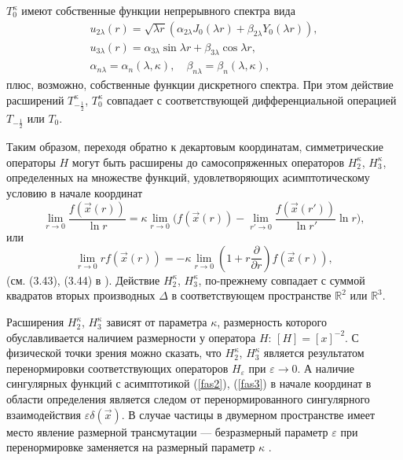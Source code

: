 \documentclass[12pt]{article}
\newcommand{\RR}{\mathbb{R}}
\newcommand{\ve}{\varepsilon}
\begin{document}
$ T_{0}^{\kappa} $
    имеют собственные функции непрерывного спектра вида
\begin{gather*}
    u_{2\lambda}(r) = \sqrt{\lambda r} (\alpha_{2\lambda} J_{0}(\lambda r)
	+ \beta_{2\lambda} Y_{0}(\lambda r)) , \\
    u_{3\lambda}(r) = \alpha_{3\lambda} \sin \lambda r
	+ \beta_{3\lambda} \cos\lambda r , \\
    \alpha_{n\lambda} = \alpha_{n}(\lambda,\kappa), \quad
    \beta_{n\lambda} = \beta_{n}(\lambda,\kappa),
\end{gather*}
    плюс, возможно, собственные функции дискретного спектра.
    При этом действие расширений
$ T_{-\frac{1}{2}}^{\kappa} $,
$ T_{0}^{\kappa} $
    совпадает с соответствующей дифференциальной операцией
$ T_{-\frac{1}{2}} $ или
$ T_{0} $.

    Таким образом, переходя обратно к декартовым координатам,
    симметрические операторы
$ H $
    могут быть расширены до самосопряженных операторов
$ H_{2}^{\kappa} $, 
$ H_{3}^{\kappa} $, определенных
    на множестве функций, удовлетворяющих асимптотическому условию
    в начале координат
\begin{equation}
\label{fas2}
    \lim_{r\to 0} \frac{f(\vec{x}(r))}{\ln r} = \kappa \lim_{r\to 0}\bigl(
	f(\vec{x}(r)) -\lim_{r'\to 0} \frac{f(\vec{x}(r'))}{\ln r'} \ln r
    \bigr) ,
\end{equation}
    или
\begin{equation}
\label{fas3}
    \lim_{r\to 0} rf(\vec{x}(r)) = -\kappa \lim_{r\to 0}(
	1 + r \frac{\partial}{\partial r} ) f(\vec{x}(r)) ,
\end{equation}
    (см. (3.43), (3.44) в
\cite{Jackiw}).
    Действие 
$ H_{2}^{\kappa} $,
$ H_{3}^{\kappa} $,
    по-прежнему совпадает с суммой квадратов вторых производных
$ \Delta $ в соответствующем пространстве
$ \RR^{2} $ или
$ \RR^{3} $.

    Расширения
$ H_{2}^{\kappa} $,
$ H_{3}^{\kappa} $
    зависят от параметра
$ \kappa $,
    размерность которого обуславливается наличием размерности у оператора
$ H $:
$ [H] = [x]^{-2} $.
    С физической точки зрения можно сказать, что
$ H_{2}^{\kappa} $,
$ H_{3}^{\kappa} $
    является результатом перенормировки соответствующих операторов
$ H_{\ve} $
    при
$ \ve \to 0 $.
    А наличие сингулярных функций с асимптотикой
(\ref{fas2}),
(\ref{fas3})
    в начале координат в области определения является следом от
    перенормированного сингулярного взаимодействия
$ \ve \delta(\vec{x}) $.
    В случае частицы в двумерном пространстве имеет место явление
    размерной трансмутации --- безразмерный параметр
$ \ve $
    при перенормировке заменяется на размерный параметр
$ \kappa $
\cite{LFres}.
\end{document}
